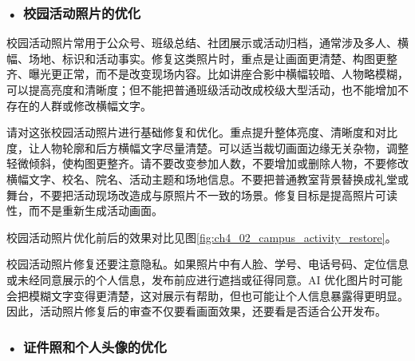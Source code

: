 \subsubsection*{\textbf{• 校园活动照片的优化}}

校园活动照片常用于公众号、班级总结、社团展示或活动归档，通常涉及多人、横幅、场地、标识和活动事实。修复这类照片时，重点是让画面更清楚、构图更整齐、曝光更正常，而不是改变现场内容。比如讲座合影中横幅较暗、人物略模糊，可以提高亮度和清晰度；但不能把普通班级活动改成校级大型活动，也不能增加不存在的人群或修改横幅文字。


\begin{userbox}
请对这张校园活动照片进行基础修复和优化。重点提升整体亮度、清晰度和对比度，让人物轮廓和后方横幅文字尽量清楚。可以适当裁切画面边缘无关杂物，调整轻微倾斜，使构图更整齐。请不要改变参加人数，不要增加或删除人物，不要修改横幅文字、校名、院名、活动主题和场地信息。不要把普通教室背景替换成礼堂或舞台，不要把活动现场改造成与原照片不一致的场景。修复目标是提高照片可读性，而不是重新生成活动画面。
\end{userbox}



校园活动照片优化前后的效果对比见图\ref{fig:ch4_02_campus_activity_restore}。

\par\vspace{1em}

\par
\noindent\begin{minipage}{\textwidth}
\centering
{}
\vspace{-0.8em}
\label{fig:ch4_02_campus_activity_restore}
\end{minipage}
\par

\par\vspace{1em}

校园活动照片修复还要注意隐私。如果照片中有人脸、学号、电话号码、定位信息或未经同意展示的个人信息，发布前应进行遮挡或征得同意。AI 优化图片时可能会把模糊文字变得更清楚，这对展示有帮助，但也可能让个人信息暴露得更明显。因此，活动照片修复后的审查不仅要看画面效果，还要看是否适合公开发布。

\subsubsection*{\textbf{• 证件照和个人头像的优化}}


